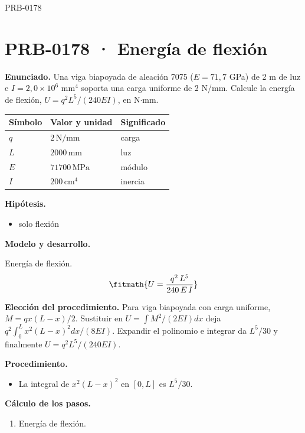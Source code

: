 \begin{studiumworked}{PRB-0178}

\section{PRB-0178 · Energía de flexión}

\textbf{Enunciado.} Una viga biapoyada de aleación 7075 ($E = 71{,}7$ GPa) de 2 m de luz e $I = 2{,}0\times 10^{6}$ mm$^4$ soporta una carga uniforme de 2 N/mm. Calcule la energía de flexión, $U = q^2 L^5/(240 E I)$, en N$\cdot$mm.

\par\medskip\noindent\begin{tabular}{@{}p{.18\linewidth}p{.26\linewidth}p{.48\linewidth}@{}}
\toprule Símbolo & Valor y unidad & Significado\\\midrule
$q$ & $2\,\mathrm{N/mm}$ & carga\\
$L$ & $2000\,\mathrm{mm}$ & luz\\
$E$ & $71700\,\mathrm{MPa}$ & módulo\\
$I$ & $200\,\mathrm{cm^4}$ & inercia\\
\bottomrule\end{tabular}\par\medskip

\textbf{Hipótesis.}\begin{itemize}\item solo flexión\end{itemize}

\textbf{Modelo y desarrollo.}

Energía de flexión.\[\fitmath{U = \frac{q^{2}\,L^{5}}{240\,E\,I}}\]

\textbf{Elección del procedimiento.} Para viga biapoyada con carga uniforme, $M=qx(L-x)/2$. Sustituir en $U=\int M^2/(2EI)dx$ deja $q^2\int_0^Lx^2(L-x)^2dx/(8EI)$. Expandir el polinomio e integrar da $L^5/30$ y finalmente $U=q^2L^5/(240EI)$.

\textbf{Procedimiento.}\begin{itemize}\item La integral de $x^2 (L - x)^2$ en $[0, L]$ es $L^5/30$.\end{itemize}

\textbf{Cálculo de los pasos.}

\begin{enumerate}

\item Energía de flexión.


\end{enumerate}
\end{studiumworked}
